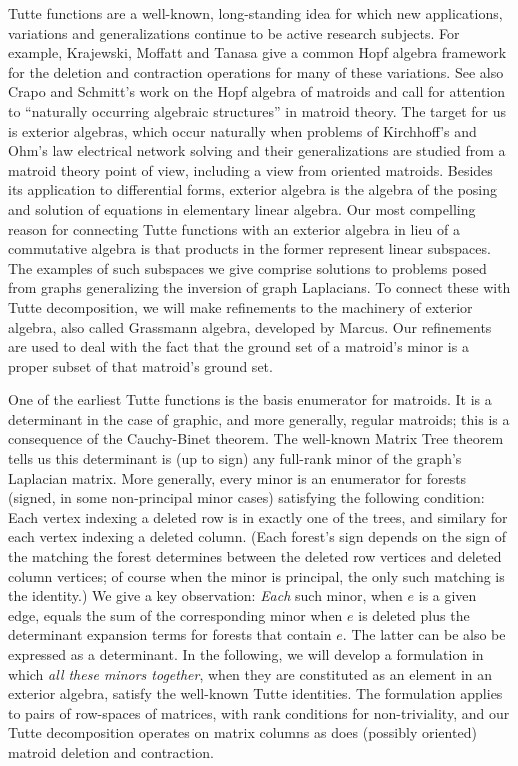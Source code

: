 \documentclass[Unicode]{cedram-alco}
\begin{document}
\noindent
Tutte functions are a well-known, long-standing idea
for which new applications, variations and generalizations
continue to be active research subjects. For example,
Krajewski, Moffatt and Tanasa give a common Hopf algebra framework
for the deletion and contraction operations for many of
these variations\cite{KRAJEWSKI2018271}.
See also Crapo and Schmitt's work
on the Hopf algebra of matroids and call
for attention to ``naturally occurring algebraic
structures'' in matroid theory\cite{CRAPO20051066}.  The target for us
is exterior algebras, which occur naturally when problems of
Kirchhoff's and Ohm's law electrical network solving and their
generalizations are studied from a matroid theory point of view,
including a view from oriented matroids.  Besides its application
to differential forms, exterior algebra is
the algebra of the posing and solution of equations in elementary
linear algebra.
Our most compelling reason for connecting
Tutte functions with an exterior algebra in lieu of a commutative algebra is that
products in the former represent linear subspaces. The examples of such subspaces
we give comprise solutions to problems posed from graphs generalizing the inversion
of graph Laplacians.  To connect these with Tutte decomposition, we will make
refinements to the machinery of exterior algebra, also called Grassmann algebra,
developed by Marcus\cite{MarcusFDMuAlPt2}.  Our refinements are used to
deal with the fact that the ground set of a matroid's minor is a proper subset
of that matroid's ground set.

One of the earliest Tutte functions is the basis enumerator for matroids. It
is a determinant in the case of graphic, and more generally, regular matroids;
this is a consequence of the Cauchy-Binet theorem.
The well-known Matrix Tree theorem tells us this determinant is (up to sign)
any full-rank minor of the graph's Laplacian matrix. More generally,
every minor is an enumerator for forests (signed, in some non-principal minor
cases) satisfying the following condition: Each vertex indexing
a deleted row is in exactly one of the trees, and similary for each
vertex indexing a deleted column\cite{sdcMTT}. (Each forest's sign depends on the sign of the
matching the forest determines between the deleted row vertices and
deleted column vertices; of course when the minor is principal,
the only such matching is the identity.)
We give a key observation: \emph{Each} such
minor, when $e$ is a given edge, equals the sum of the corresponding
minor when $e$ is deleted plus the determinant expansion terms for
forests that contain $e$.  The latter can be also be expressed as a determinant.
In the following, we will develop a formulation in which
\emph{all these minors together},
when they are constituted as an element in an exterior algebra, satisfy the
well-known Tutte identities.  The formulation applies to pairs of
row-spaces of matrices, with rank conditions for non-triviality,
and our Tutte decomposition operates on matrix
columns as does (possibly oriented)
matroid deletion and contraction.
\end{document}

